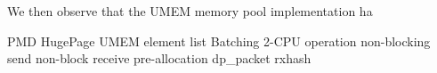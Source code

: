 \documentclass[10pt]{sigplanconf}
\newcommand{\mycomment}[1]{}
\begin{document}
We then observe that the UMEM memory pool implementation ha



PMD
HugePage
UMEM element list
Batching
2-CPU operation
non-blocking send
non-block receive
pre-allocation dp\_packet
rxhash

\mycomment{
/* PMD: Poll modes drivers.  PMD accesses devices via polling to eliminate
 * the performance overhead of interrupt processing.  Therefore netdev can
 * not implement rx-wait for these devices.  dpif-netdev needs to poll
 * these device to check for recv buffer.  pmd-thread does polling for
 * devices assigned to itself.
 *
 * DPDK used PMD for accessing NIC.
 *}




\end{document}
